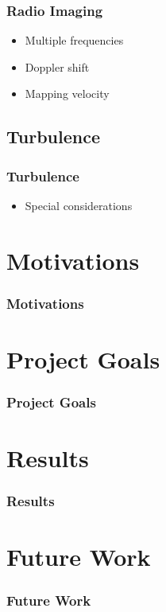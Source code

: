 \documentclass[aspectratio=169,compress]{beamer}
\begin{document}
\begin{frame}
  \frametitle{Radio Imaging}
  \begin{itemize}
    \item Multiple frequencies
    \item Doppler shift
    \item Mapping velocity
  \end{itemize}
\end{frame}

\subsection{Turbulence}
\begin{frame}
  \frametitle{Turbulence}
  \begin{itemize}
    \item Special considerations

  \end{itemize}
\end{frame}

\section{Motivations}
\begin{frame}
  \frametitle{Motivations}
\end{frame}

\section{Project Goals}
\begin{frame}
  \frametitle{Project Goals}
\end{frame}

\section{Results}
\begin{frame}
  \frametitle{Results}
\end{frame}

\section{Future Work}
\begin{frame}
  \frametitle{Future Work}
\end{frame}
\end{document}
